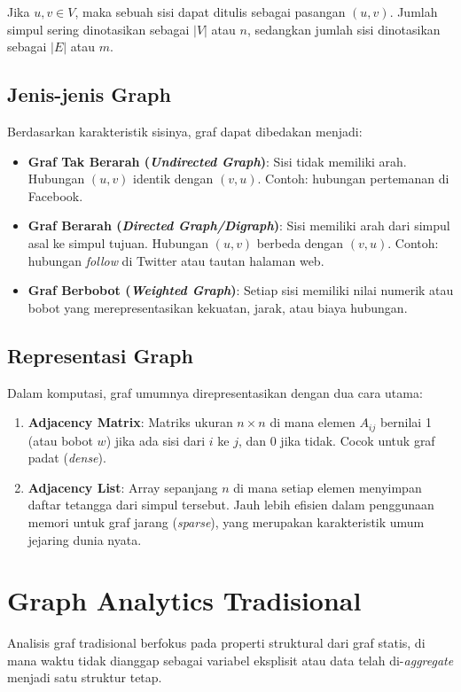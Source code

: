 \documentclass[12pt,a4paper]{book}
\begin{document}
Jika $u, v \in V$, maka sebuah sisi dapat ditulis sebagai pasangan $(u, v)$. Jumlah simpul sering dinotasikan sebagai $|V|$ atau $n$, sedangkan jumlah sisi dinotasikan sebagai $|E|$ atau $m$.

\subsection{Jenis-jenis Graph}
Berdasarkan karakteristik sisinya, graf dapat dibedakan menjadi:
\begin{itemize}
    \item \textbf{Graf Tak Berarah (\textit{Undirected Graph})}: Sisi tidak memiliki arah. Hubungan $(u, v)$ identik dengan $(v, u)$. Contoh: hubungan pertemanan di Facebook.
    \item \textbf{Graf Berarah (\textit{Directed Graph/Digraph})}: Sisi memiliki arah dari simpul asal ke simpul tujuan. Hubungan $(u, v)$ berbeda dengan $(v, u)$. Contoh: hubungan \textit{follow} di Twitter atau tautan halaman web.
    \item \textbf{Graf Berbobot (\textit{Weighted Graph})}: Setiap sisi memiliki nilai numerik atau bobot yang merepresentasikan kekuatan, jarak, atau biaya hubungan.
\end{itemize}

\subsection{Representasi Graph}
Dalam komputasi, graf umumnya direpresentasikan dengan dua cara utama:
\begin{enumerate}
    \item \textbf{Adjacency Matrix}: Matriks ukuran $n \times n$ di mana elemen $A_{ij}$ bernilai 1 (atau bobot $w$) jika ada sisi dari $i$ ke $j$, dan 0 jika tidak. Cocok untuk graf padat (\textit{dense}).
    \item \textbf{Adjacency List}: Array sepanjang $n$ di mana setiap elemen menyimpan daftar tetangga dari simpul tersebut. Jauh lebih efisien dalam penggunaan memori untuk graf jarang (\textit{sparse}), yang merupakan karakteristik umum jejaring dunia nyata.
\end{enumerate}

\section{Graph Analytics Tradisional}
Analisis graf tradisional berfokus pada properti struktural dari graf statis, di mana waktu tidak dianggap sebagai variabel eksplisit atau data telah di-\textit{aggregate} menjadi satu struktur tetap.
\end{document}
